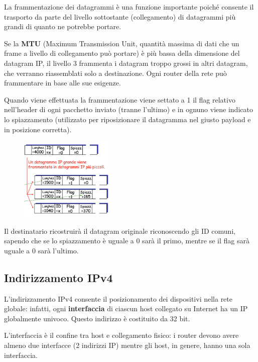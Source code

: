 \documentclass{report}
\begin{document}
La frammentazione dei datagrammi è una funzione importante poiché
consente il trasporto da parte del livello sottostante (collegamento) di
datagrammi più grandi di quanto ne potrebbe portare.

Se la \textbf{MTU} (Maximum Transmission Unit, quantità massima di dati
che un frame a livello di collegamento può portare) è più bassa della
dimensione del datagram IP, il livello 3 frammenta i datagram troppo
grossi in altri datagram, che verranno riassemblati solo a destinazione.
Ogni router della rete può frammentare in base alle sue esigenze.

Quando viene effettuata la frammentazione viene settato a 1 il flag
relativo nell'header di ogni pacchetto inviato (tranne l'ultimo) e in
ognuno viene indicato lo spiazzamento (utilizzato per riposizionare il
datagramma nel giusto payload e in posizione corretta).

\begin{figure}
		\centering
		\includegraphics[width=0.4\textwidth]{frammentazione}
		\vspace{-30pt}
	\end{figure}

Il destinatario ricostruirà il datagram originale riconoscendo gli ID
comuni, sapendo che se lo spiazzamento è uguale a 0 sarà il primo,
mentre se il flag sarà uguale a 0 sarà l'ultimo.

\hypertarget{header-n97}{%
\subsection{Indirizzamento IPv4}\label{header-n97}}

L'indirizzamento IPv4 consente il posizionamento dei dispositivi nella
rete globale: infatti, ogni \textbf{interfaccia} di ciascun host
collegato su Internet ha un IP globalmente univoco. Questo indirizzo è
costituito da 32 bit.

L'interfaccia è il confine tra host e collegamento fisico: i router
devono avere almeno due interfacce (2 indirizzi IP) mentre gli host, in
genere, hanno una sola interfaccia.
\end{document}

